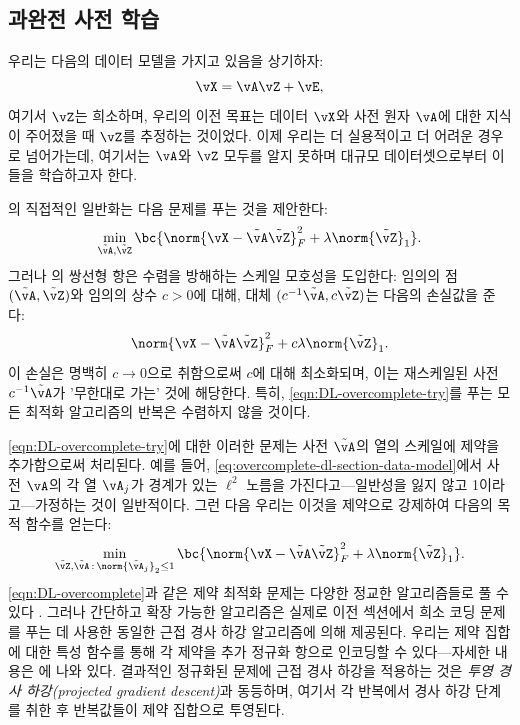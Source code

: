 \documentclass[../../book-main_ko.tex]{subfiles}
\begin{document}
\subsection{과완전 사전 학습}

우리는 다음의 데이터 모델을 가지고 있음을 상기하자:
\begin{equation}\label{eq:overcomplete-dl-section-data-model}
    \vX = \vA\vZ + \vE,
\end{equation}
여기서 \(\vZ\)는 희소하며, 우리의 이전 목표는 데이터 \(\vX\)와 사전 원자 \(\vA\)에 대한 지식이 주어졌을 때 \(\vZ\)를 추정하는 것이었다. 이제 우리는 더 실용적이고 더 어려운 경우로 넘어가는데, 여기서는 \(\vA\)와 \(\vZ\) 모두를 알지 못하며 대규모 데이터셋으로부터 이들을 학습하고자 한다.

의 직접적인 일반화는 다음 문제를 푸는 것을 제안한다:
\begin{equation}
    \min_{\tilde{\vA}, \tilde{\vZ}}\bc{\norm{\vX - \tilde{\vA}\tilde{\vZ}}_{F}^{2} + \lambda \norm{\tilde{\vZ}}_{1}}.
    \label{eqn:DL-overcomplete-try}
\end{equation}
그러나 의 쌍선형 항은 수렴을 방해하는 스케일 모호성을 도입한다: 임의의 점 $(\tilde{\vA}, \tilde{\vZ})$와 임의의 상수 $c>0$에 대해, 대체 $(c^{-1}\tilde{\vA}, c\tilde{\vZ})$는 다음의 손실값을 준다:
\begin{equation}
    \norm{\vX - \tilde{\vA}\tilde{\vZ}}_{F}^{2} + c\lambda \norm{\tilde{\vZ}}_{1}.
\end{equation}
이 손실은 명백히 $c \to 0$으로 취함으로써 $c$에 대해 최소화되며, 이는 재스케일된 사전 $c^{-1} \tilde{\vA}$가 '무한대로 가는' 것에 해당한다. 특히, \eqref{eqn:DL-overcomplete-try}를 푸는 모든 최적화 알고리즘의 반복은 수렴하지 않을 것이다.

\eqref{eqn:DL-overcomplete-try}에 대한 이러한 문제는 사전 $\tilde{\vA}$의 열의 스케일에 제약을 추가함으로써 처리된다. 예를 들어, \eqref{eq:overcomplete-dl-section-data-model}에서 사전 $\vA$의 각 열 $\vA_j$가 경계가 있는 $\ell^2$ 노름을 가진다고—일반성을 잃지 않고 1이라고—가정하는 것이 일반적이다. 그런 다음 우리는 이것을 제약으로 강제하여 다음의 목적 함수를 얻는다:
\begin{equation}
    \min_{\tilde{\vZ}, \tilde{\vA} \,:\, \norm{\tilde{\vA}_j}_2 \leq 1}
    \bc{\norm{\vX - \tilde{\vA}\tilde{\vZ}}_{F}^{2} + \lambda \norm{\tilde{\vZ}}_{1}}.
    \label{eqn:DL-overcomplete}
\end{equation}
\eqref{eqn:DL-overcomplete}과 같은 제약 최적화 문제는 다양한 정교한 알고리즘들로 풀 수 있다 \cite{nocedal2006numerical}. 그러나 간단하고 확장 가능한 알고리즘은 실제로 이전 섹션에서 희소 코딩 문제를 푸는 데 사용한 동일한 근접 경사 하강 알고리즘에 의해 제공된다. 우리는 제약 집합에 대한 특성 함수를 통해 각 제약을 추가 정규화 항으로 인코딩할 수 있다—자세한 내용은 에 나와 있다. 결과적인 정규화된 문제에 근접 경사 하강을 적용하는 것은 \textit{투영 경사 하강(projected gradient descent)}과 동등하며, 여기서 각 반복에서 경사 하강 단계를 취한 후 반복값들이 제약 집합으로 투영된다.
\end{document}
